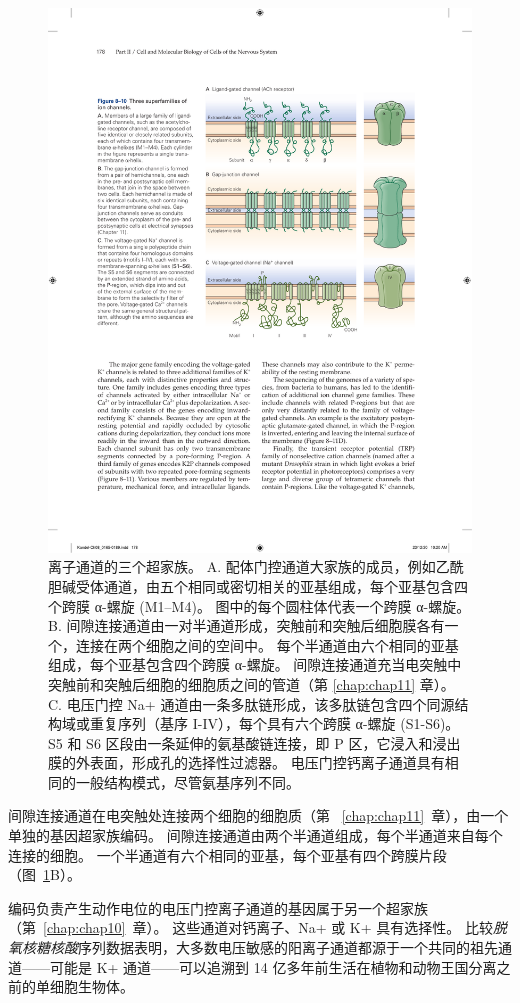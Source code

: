 \begin{figure}[htbp]
	\centering
	\includegraphics[width=0.7\linewidth]{chap08/fig_8_10}
	\caption{离子通道的三个超家族。 A. 配体门控通道大家族的成员，例如乙酰胆碱受体通道，由五个相同或密切相关的亚基组成，每个亚基包含四个跨膜 α-螺旋 (M1–M4)。 图中的每个圆柱体代表一个跨膜 α-螺旋。 B. 间隙连接通道由一对半通道形成，突触前和突触后细胞膜各有一个，连接在两个细胞之间的空间中。 每个半通道由六个相同的亚基组成，每个亚基包含四个跨膜 α-螺旋。 间隙连接通道充当电突触中突触前和突触后细胞的细胞质之间的管道（第 \ref{chap:chap11} 章）。 C. 电压门控 Na+ 通道由一条多肽链形成，该多肽链包含四个同源结构域或重复序列（基序 I-IV），每个具有六个跨膜 α-螺旋 (S1-S6)。 S5 和 S6 区段由一条延伸的氨基酸链连接，即 P 区，它浸入和浸出膜的外表面，形成孔的选择性过滤器。 电压门控钙离子通道具有相同的一般结构模式，尽管氨基序列不同。}
	\label{fig:8_10}
\end{figure}




间隙连接通道在电突触处连接两个细胞的细胞质（第 ~\ref{chap:chap11}~章），由一个单独的基因超家族编码。
间隙连接通道由两个半通道组成，每个半通道来自每个连接的细胞。
一个半通道有六个相同的亚基，每个亚基有四个跨膜片段（图~\ref{fig:8_10}B）。


编码负责产生动作电位的电压门控离子通道的基因属于另一个超家族（第~\ref{chap:chap10}~章）。
这些通道对钙离子、Na+ 或 K+ 具有选择性。
比较\textit{脱氧核糖核酸}序列数据表明，大多数电压敏感的阳离子通道都源于一个共同的祖先通道——可能是 K+ 通道——可以追溯到 14 亿多年前生活在植物和动物王国分离之前的单细胞生物体。


